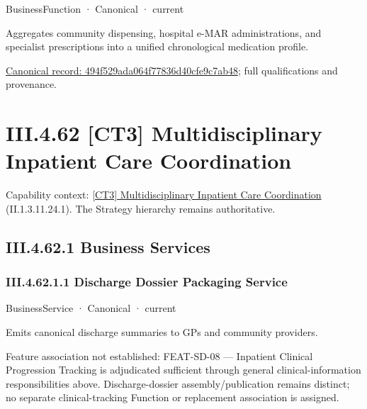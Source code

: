\label{element:494f529ada064f77836d40cfe9c7ab48}
{\small BusinessFunction · Canonical · current}\par

Aggregates community dispensing, hospital e-MAR administrations, and specialist prescriptions into a unified chronological medication profile.


{\footnotesize \href{../../../../continuum/business/business-function/494f529ada064f77836d40cfe9c7ab48.md}{Canonical record: 494f529ada064f77836d40cfe9c7ab48}; full qualifications and provenance.}\par
\section*{III.4.62 [CT3] Multidisciplinary Inpatient Care Coordination}
\label{navigation:III.4.62}

{\small Capability context: \hyperref[element:c798e38e12e5428dbb8b3cabc977d430]{[CT3] Multidisciplinary Inpatient Care Coordination} (II.1.3.11.24.1). The Strategy hierarchy remains authoritative.}\par
\subsection*{III.4.62.1 Business Services}
\label{navigation:III.4.62.1}

\subsubsection*{III.4.62.1.1 Discharge Dossier Packaging Service}
\label{navigation:III.4.62.1.1}

\label{element:02a17f4f9b0a425299141261130a1768}
{\small BusinessService · Canonical · current}\par

Emits canonical discharge summaries to GPs and community providers.



Feature association not established: FEAT-SD-08 — Inpatient Clinical Progression Tracking is adjudicated sufficient through general clinical-information responsibilities above. Discharge-dossier assembly/publication remains distinct; no separate clinical-tracking Function or replacement association is assigned.



